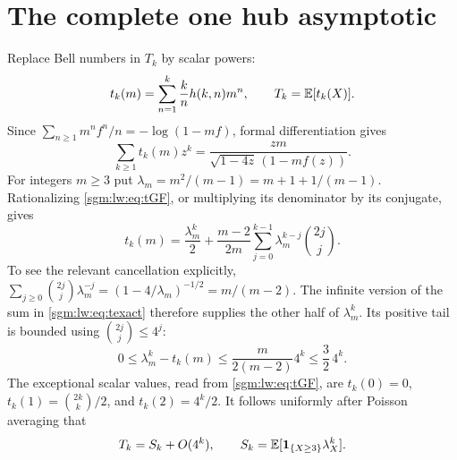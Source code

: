 \documentclass[11pt,letterpaper]{article}
\theoremstyle{remark}\newtheorem{remark}[theorem]{Remark}
\theoremstyle{definition}\newtheorem{definition}[theorem]{Definition}
\begin{document}
\section{The complete one hub asymptotic}
Replace Bell numbers in $T_k$ by scalar powers:
\[
 t_k(m)=\sum_{n=1}^k\frac{k}{n}h(k,n)m^n,
 \qquad T_k=\mathbb E[t_k(X)].
\]
Since $\sum_{n\ge1}m^nf^n/n=-\log(1-mf)$, formal differentiation gives
\begin{equation}\label{sgm:lw:eq:tGF}
 \sum_{k\ge1}t_k(m)z^k
 =\frac{zm}{\sqrt{1-4z}\,(1-mf(z))}.
\end{equation}
For integers $m\ge3$ put
$\lambda_m=m^2/(m-1)=m+1+1/(m-1)$. Rationalizing \eqref{sgm:lw:eq:tGF}, or multiplying its denominator by its conjugate, gives
\begin{equation}\label{sgm:lw:eq:texact}
 t_k(m)=\frac{\lambda_m^k}{2}
    +\frac{m-2}{2m}\sum_{j=0}^{k-1}\lambda_m^{k-j}\binom{2j}{j}.
\end{equation}
To see the relevant cancellation explicitly,
$\sum_{j\ge0}\binom{2j}{j}\lambda_m^{-j}
=(1-4/\lambda_m)^{-1/2}=m/(m-2)$.
The infinite version of the sum in \eqref{sgm:lw:eq:texact} therefore supplies the other half of $\lambda_m^k$. Its positive tail is bounded using $\binom{2j}{j}\le4^j$:
\begin{equation}\label{sgm:lw:eq:tbound}
 0\le\lambda_m^k-t_k(m)
 \le\frac{m}{2(m-2)}4^k\le\frac32\,4^k.
\end{equation}
The exceptional scalar values, read from \eqref{sgm:lw:eq:tGF}, are
$t_k(0)=0$, $t_k(1)=\binom{2k}{k}/2$, and $t_k(2)=4^k/2$.
It follows uniformly after Poisson averaging that
\begin{equation}\label{sgm:lw:eq:Texpect}
 T_k=S_k+O(4^k),\qquad
 S_k=\mathbb E[\mathbf 1_{\{X\ge3\}}\lambda_X^k].
\end{equation}
\end{document}
